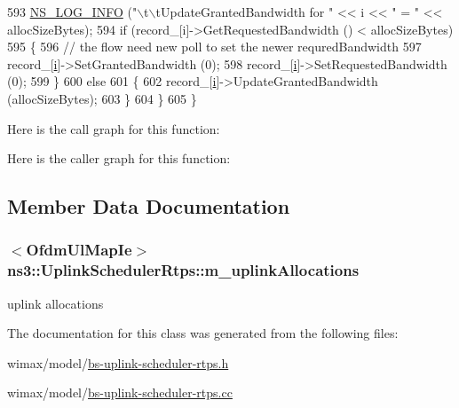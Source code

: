 \begin{DoxyCode}
593       \hyperlink{group__logging_gafbd73ee2cf9f26b319f49086d8e860fb}{NS\_LOG\_INFO} (\textcolor{stringliteral}{"\(\backslash\)t\(\backslash\)tUpdateGrantedBandwidth for "} << i << \textcolor{stringliteral}{" = "} << allocSizeBytes);
594       \textcolor{keywordflow}{if} (record\_[i]->GetRequestedBandwidth () < allocSizeBytes)
595         \{
596           \textcolor{comment}{// the flow need new poll to set the newer requredBandwidth}
597           record\_[\hyperlink{bernuolliDistribution_8m_a6f6ccfcf58b31cb6412107d9d5281426}{i}]->SetGrantedBandwidth (0);
598           record\_[\hyperlink{bernuolliDistribution_8m_a6f6ccfcf58b31cb6412107d9d5281426}{i}]->SetRequestedBandwidth (0);
599         \}
600       \textcolor{keywordflow}{else}
601         \{
602           record\_[\hyperlink{bernuolliDistribution_8m_a6f6ccfcf58b31cb6412107d9d5281426}{i}]->UpdateGrantedBandwidth (allocSizeBytes);
603         \}
604     \}
605 \}
\end{DoxyCode}


Here is the call graph for this function\+:




Here is the caller graph for this function\+:




\subsection{Member Data Documentation}
\subsubsection[{\texorpdfstring{m\+\_\+uplink\+Allocations}{m_uplinkAllocations}}]{$<${\bf Ofdm\+Ul\+Map\+Ie}$>$ ns3\+::\+Uplink\+Scheduler\+Rtps\+::m\+\_\+uplink\+Allocations\hspace{0.3cm}{\ttfamily [private]}}\hypertarget{classns3_1_1UplinkSchedulerRtps_a4cb3da7f31082b64a21b7f9adc7fd2e4}{}\label{classns3_1_1UplinkSchedulerRtps_a4cb3da7f31082b64a21b7f9adc7fd2e4}


uplink allocations 



The documentation for this class was generated from the following files\+:\begin{DoxyCompactItemize}
\item 
wimax/model/\hyperlink{bs-uplink-scheduler-rtps_8h}{bs-\/uplink-\/scheduler-\/rtps.\+h}\item 
wimax/model/\hyperlink{bs-uplink-scheduler-rtps_8cc}{bs-\/uplink-\/scheduler-\/rtps.\+cc}\end{DoxyCompactItemize}
